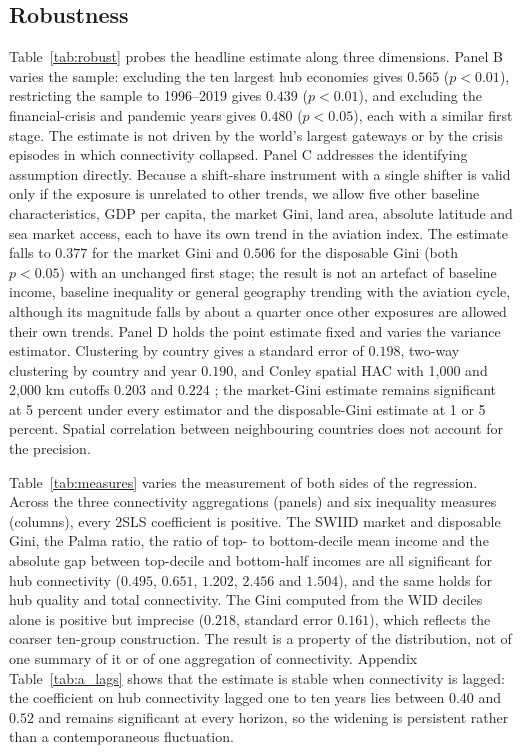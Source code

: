 

\subsection{Robustness}
\label{sec:robust}
Table~\ref{tab:robust} probes the headline estimate along three dimensions. Panel B varies the sample: excluding the ten largest hub economies gives $0.565$ ($p<0.01$), restricting the sample to 1996--2019 gives $0.439$ ($p<0.01$), and excluding the financial-crisis and pandemic years gives $0.480$ ($p<0.05$), each with a similar first stage. The estimate is not driven by the world's largest gateways or by the crisis episodes in which connectivity collapsed. Panel C addresses the identifying assumption directly. Because a shift-share instrument with a single shifter is valid only if the exposure is unrelated to other trends, we allow five other baseline characteristics, GDP per capita, the market Gini, land area, absolute latitude and sea market access, each to have its own trend in the aviation index. The estimate falls to $0.377$ for the market Gini and $0.506$ for the disposable Gini (both $p<0.05$) with an unchanged first stage; the result is not an artefact of baseline income, baseline inequality or general geography trending with the aviation cycle, although its magnitude falls by about a quarter once other exposures are allowed their own trends. Panel D holds the point estimate fixed and varies the variance estimator. Clustering by country gives a standard error of $0.198$, two-way clustering by country and year $0.190$, and Conley spatial HAC with 1{,}000 and 2{,}000 km cutoffs $0.203$ and $0.224$ \citep{Conley_1999}; the market-Gini estimate remains significant at 5 percent under every estimator and the disposable-Gini estimate at 1 or 5 percent. Spatial correlation between neighbouring countries does not account for the precision.



Table~\ref{tab:measures} varies the measurement of both sides of the regression. Across the three connectivity aggregations (panels) and six inequality measures (columns), every 2SLS coefficient is positive. The SWIID market and disposable Gini, the Palma ratio, the ratio of top- to bottom-decile mean income and the absolute gap between top-decile and bottom-half incomes are all significant for hub connectivity ($0.495$, $0.651$, $1.202$, $2.456$ and $1.504$), and the same holds for hub quality and total connectivity. The Gini computed from the WID deciles alone is positive but imprecise ($0.218$, standard error $0.161$), which reflects the coarser ten-group construction. The result is a property of the distribution, not of one summary of it or of one aggregation of connectivity. Appendix Table~\ref{tab:a_lags} shows that the estimate is stable when connectivity is lagged: the coefficient on hub connectivity lagged one to ten years lies between $0.40$ and $0.52$ and remains significant at every horizon, so the widening is persistent rather than a contemporaneous fluctuation.

